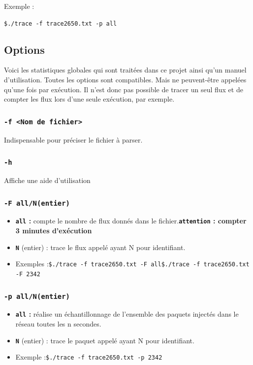 \documentclass[
10pt, %
a4paper, %
oneside, %
headinclude,footinclude, %
BCOR5mm, %
]{scrartcl}
\begin{document}
	Exemple :
	
	 \centerline{\texttt{\$./trace -f trace2650.txt -p all}}

\subsection{Options}
	Voici les statistiques globales qui sont traitées dans ce projet ainsi qu'un manuel d'utilisation. Toutes les options sont compatibles. Mais ne peuvent-être appelées qu'une fois par exécution. Il n'est donc pas possible de tracer un seul flux et de compter les flux lors d'une seule exécution, par exemple.
	


\subsubsection{\texttt{-f <Nom de fichier>}}
  Indispensable pour préciser le fichier à parser.	

\subsubsection{\texttt{-h}}
Affiche une aide d'utilisation

\subsubsection{\texttt{-F all/N(entier)}}
\begin{itemize}
  \item \textbf{\texttt{all} : }
compte le nombre de flux donnés dans le fichier.\newline \textbf{\texttt{attention} : compter 3 minutes d'exécution}
  \item \textbf{\texttt{N}} (entier) : trace le flux appelé ayant N pour identifiant.
  \item Exemples :\newline\texttt{\$./trace -f trace2650.txt -F all}\newline\texttt{\$./trace -f trace2650.txt -F 2342}
\end{itemize}
\subsubsection{\texttt{-p all/N(entier)}}
\begin{itemize}
\item \textbf{\texttt{all} : }
	réalise un échantillonnage de l'ensemble des paquets injectés dans le réseau toutes les n secondes.
  \item \textbf{\texttt{N}} (entier) : trace le paquet appelé ayant N pour identifiant.
  \item Exemple :\newline\texttt{\$./trace -f trace2650.txt -p 2342}
\end{itemize}
\end{document}
